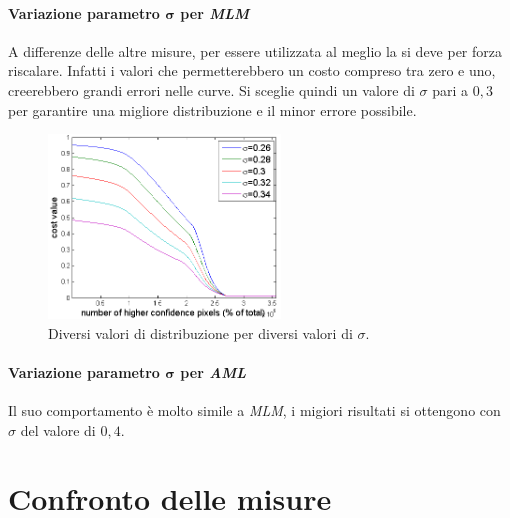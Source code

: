 \documentclass[12pt]{report}
\begin{document}
			
			\paragraph{Variazione parametro $\bm{\sigma}$ per \textit{MLM}}	 	 	
			\label{par:sigmaMLM}
		 	 
		 	 	A differenze delle altre misure, per essere utilizzata al meglio la si deve per forza riscalare. Infatti i valori che permetterebbero un costo compreso tra zero e uno, creerebbero grandi errori nelle curve. Si sceglie quindi un valore di $\sigma$ pari a $0,3$ per garantire una migliore distribuzione e il minor errore possibile. 
		 	 	
		 	 	\begin{figure}[H]
			 	 	\centering
			 	 	\includegraphics[width=0.55\textwidth]{./figures/sigma_MLM.png}
			 	 	\caption{Diversi valori di distribuzione per diversi valori di $\sigma$.}
			 	 	\label{fig:sigmaMLM}
		 	 	\end{figure}
		 	 	
		 	 \paragraph{Variazione parametro $\bm{\sigma}$ per \textit{AML}}	 	 	
		 	 \label{par:sigmaAML}	
		 	 	
		 	 	Il suo comportamento è molto simile a \textit{MLM}, i migiori risultati si ottengono con $\sigma$ del valore di $0,4$.
		 	 	
		 	 	
		 	 	
		\section{Confronto delle misure}
		\label{sec:confronto}		 	
			  
\end{document}
